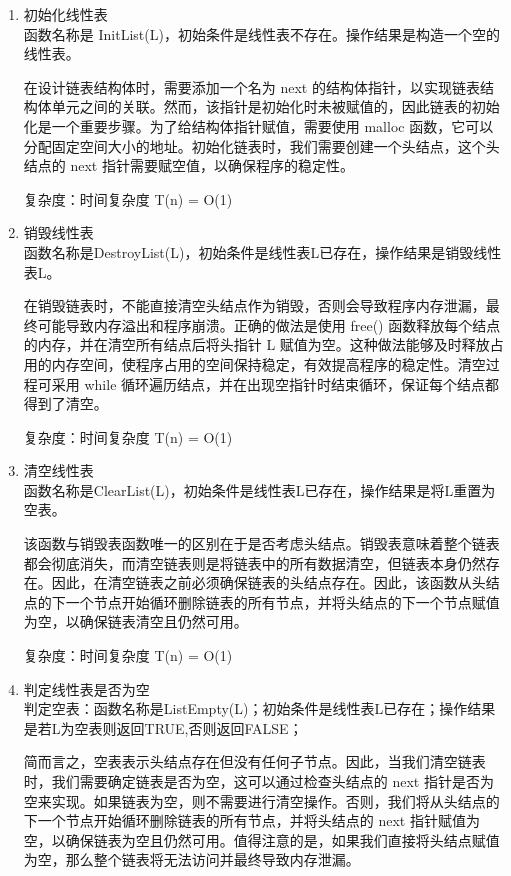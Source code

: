 \documentclass[supercite]{Experimental_Report}
\theoremstyle{definition}
\begin{document}
\begin{enumerate}
	\item 初始化线性表\\
	函数名称是 InitList(L)，初始条件是线性表不存在。操作结果是构造一个空的线性表。
	
	在设计链表结构体时，需要添加一个名为 next 的结构体指针，以实现链表结构体单元之间的关联。然而，该指针是初始化时未被赋值的，因此链表的初始化是一个重要步骤。为了给结构体指针赋值，需要使用 malloc 函数，它可以分配固定空间大小的地址。初始化链表时，我们需要创建一个头结点，这个头结点的 next 指针需要赋空值，以确保程序的稳定性。
	
	复杂度：时间复杂度 T(n) = O(1)
	\item 销毁线性表\\
	函数名称是DestroyList(L)，初始条件是线性表L已存在，操作结果是销毁线性表L。
	
	在销毁链表时，不能直接清空头结点作为销毁，否则会导致程序内存泄漏，最终可能导致内存溢出和程序崩溃。正确的做法是使用 free() 函数释放每个结点的内存，并在清空所有结点后将头指针 L 赋值为空。这种做法能够及时释放占用的内存空间，使程序占用的空间保持稳定，有效提高程序的稳定性。清空过程可采用 while 循环遍历结点，并在出现空指针时结束循环，保证每个结点都得到了清空。
	
	复杂度：时间复杂度 T(n) = O(1)
	\item 清空线性表\\
	函数名称是ClearList(L)，初始条件是线性表L已存在，操作结果是将L重置为空表。
	
	该函数与销毁表函数唯一的区别在于是否考虑头结点。销毁表意味着整个链表都会彻底消失，而清空链表则是将链表中的所有数据清空，但链表本身仍然存在。因此，在清空链表之前必须确保链表的头结点存在。因此，该函数从头结点的下一个节点开始循环删除链表的所有节点，并将头结点的下一个节点赋值为空，以确保链表清空且仍然可用。
	
	复杂度：时间复杂度 T(n) = O(1)
	\item 判定线性表是否为空\\
	判定空表：函数名称是ListEmpty(L)；初始条件是线性表L已存在；操作结果是若L为空表则返回TRUE,否则返回FALSE；
	
	简而言之，空表表示头结点存在但没有任何子节点。因此，当我们清空链表时，我们需要确定链表是否为空，这可以通过检查头结点的 next 指针是否为空来实现。如果链表为空，则不需要进行清空操作。否则，我们将从头结点的下一个节点开始循环删除链表的所有节点，并将头结点的 next 指针赋值为空，以确保链表为空且仍然可用。值得注意的是，如果我们直接将头结点赋值为空，那么整个链表将无法访问并最终导致内存泄漏。
	

\end{enumerate}
\end{document}
